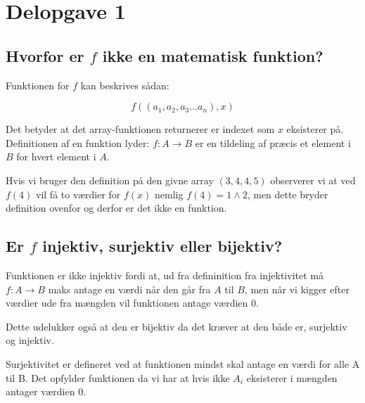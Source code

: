 \section{Delopgave 1}\label{sec:delopgave-12}

\subsection{Hvorfor er \(f\) ikke en matematisk funktion?}\label{subsec:hvorfor-er-(f)-ikke-en-matematisk-funktion?}

Funktionen for \(f\) kan beskrives sådan:

\begin{equation}
    f((a_{1}, a_{2}, a_{3} \dots a_{n}), x)
    \label{eq:equation12}
\end{equation}

Det betyder at det array-funktionen returnerer er indexet som \(x\) eksisterer på.
Definitionen af en funktion lyder: \(f: A \rightarrow B\) er en tildeling af præcis et element i \(B\) for hvert
element i \(A\).

Hvis vi bruger den definition på den givne array \(\left(3, 4, 4, 5\right)\) observerer vi at ved \(f(4)\) vil få to
værdier for \(f(x)\) nemlig \(f(4) = 1 \wedge 2\), men dette bryder definition ovenfor og derfor er det ikke en
funktion.

\subsection{Er \(f\) injektiv, surjektiv eller bijektiv?}\label{subsec:er-(f)-injektiv-surjektiv-eller-bijektiv?}

Funktionen er ikke injektiv fordi at, ud fra defininition fra injektivitet må \( f: A \rightarrow B \) maks antage en
værdi når den går fra \(A\) til \(B\), men når vi kigger efter værdier ude fra mængden vil funktionen antage værdien
\(0\).

Dette udelukker også at den er bijektiv da det kræver at den både er, surjektiv og injektiv.

Surjektivitet er defineret ved at funktionen mindst skal antage en værdi for alle A til B\@.
Det opfylder funktionen da vi har at hvis ikke \(A_{i}\) eksisterer i mængden antager værdien \(0\).
